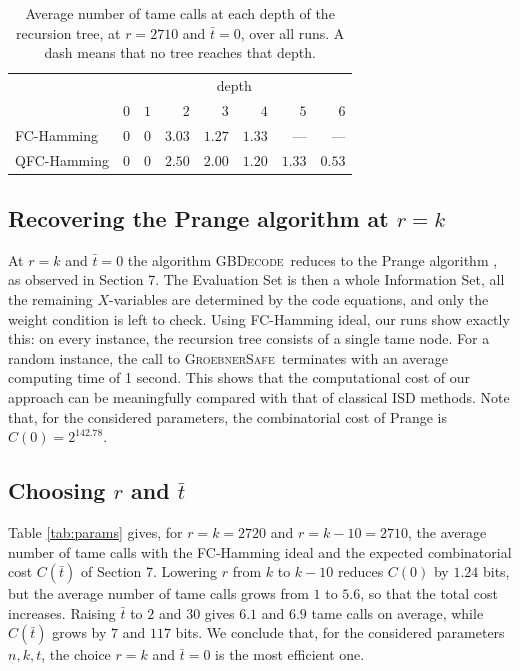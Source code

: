 \documentclass{amsart}
\def\GBSafe{{\textsc{GroebnerSafe}}}
\def\GBDecode{{\textsc{GBDecode}}}
\def\bt{{\bar{t}}}
\begin{document}
\begin{table}[H]
\begin{center}
\small
\begin{tabular}{lrrrrrrr}
\hline
 & \multicolumn{7}{c}{depth} \\
 & $0$ & $1$ & $2$ & $3$ & $4$ & $5$ & $6$ \\
\hline
FC-Hamming  & $0$ & $0$ & $3.03$ & $1.27$ & $1.33$ & --- & --- \\
QFC-Hamming & $0$ & $0$ & $2.50$ & $2.00$ & $1.20$ & $1.33$ & $0.53$ \\
\hline
\end{tabular}
\end{center}
\caption{Average number of tame calls at each depth of the recursion tree,
at $r = 2710$ and $\bt = 0$, over all runs. A dash means that no tree reaches that depth.}
\label{tab:depth}
\end{table}

\subsection*{Recovering the Prange algorithm at $r = k$}

At $r = k$ and $\bt = 0$ the algorithm \GBDecode\ reduces to the Prange algorithm
\cite{Pra}, as observed in Section 7. The Evaluation Set is then a whole Information Set,
all the remaining $X$-variables are determined by the code equations, and only the weight
condition is left to check. Using FC-Hamming ideal, our runs show exactly this: on every
instance, the recursion tree consists of a single tame node. For a random instance,
the call to \GBSafe\ terminates with an average computing time of 1 second.
This shows that the computational cost of our approach can be meaningfully compared
with that of classical ISD methods. Note that, for the considered parameters, the combinatorial
cost of Prange is $C(0) = 2^{142.78}$.

\subsection*{Choosing $r$ and $\bt$}

Table \ref{tab:params} gives, for $r = k = 2720$ and $r = k - 10 = 2710$, the average number
of tame calls with the FC-Hamming ideal and the expected combinatorial cost $C(\bt)$
of Section 7. Lowering $r$ from $k$ to $k - 10$ reduces $C(0)$ by $1.24$ bits, but the average
number of tame calls grows from $1$ to $5.6$, so that the total cost increases. Raising $\bt$
to $2$ and $30$ gives $6.1$ and $6.9$ tame calls on average, while $C(\bt)$ grows by $7$ and
$117$ bits. We conclude that, for the considered parameters $n,k,t$, the choice $r = k$ and $\bt = 0$
is the most efficient one.
\end{document}
